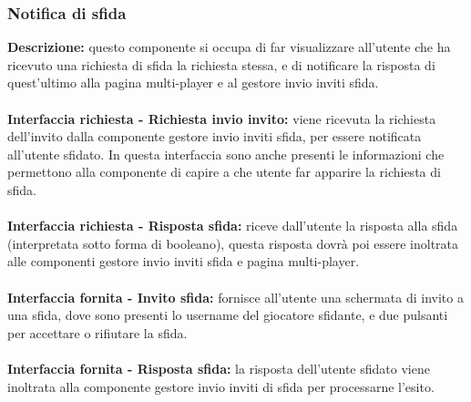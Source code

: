 \subsubsection{Notifica di sfida}
\textbf{Descrizione: }questo componente si occupa di far visualizzare all'utente che ha ricevuto una richiesta di sfida la richiesta stessa, e di notificare la risposta di quest'ultimo alla pagina multi-player e al gestore invio inviti sfida.\\
\\
\textbf{Interfaccia richiesta - Richiesta invio invito: }viene ricevuta la richiesta dell'invito dalla componente gestore invio inviti sfida, per essere notificata all'utente sfidato. In questa interfaccia sono anche presenti le informazioni che permettono alla componente di capire a che utente far apparire la richiesta di sfida.\\
\\
\textbf{Interfaccia richiesta - Risposta sfida: }riceve dall'utente la risposta alla sfida (interpretata sotto forma di booleano), questa risposta dovrà poi essere inoltrata alle componenti gestore invio inviti sfida e pagina multi-player.\\
\\
\textbf{Interfaccia fornita - Invito sfida: }fornisce all'utente una schermata di invito a una sfida, dove sono presenti lo username del giocatore sfidante, e due pulsanti per accettare o rifiutare la sfida.\\
\\
\textbf{Interfaccia fornita - Risposta sfida: }la risposta dell'utente sfidato viene inoltrata alla componente gestore invio inviti di sfida per processarne l'esito.\\

